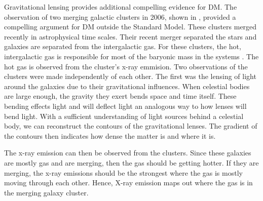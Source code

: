 \begin{figure}[ht]
\end{figure}

Gravitational lensing provides additional compelling evidence for DM.
The observation of two merging galactic clusters in 2006, shown in , provided a compelling argument for DM outside the Standard Model.
These clusters merged recently in astrophysical time scales.
Their recent merger separated the stars and galaxies are separated from the intergalactic gas.
For these clusters, the hot, intergalactic gas is responsible for most of the baryonic mass in the systems \cite{Hooper:DMHistory}.
The hot gas is observed from the cluster's x-ray emmision.
Two observations of the clusters were made independently of each other.
The first was the lensing of light around the galaxies due to their gravitational influences.
When celestial bodies are large enough, the gravity they exert bends space and time itself.
These bending effects light and will deflect light an analogous way to how lenses will bend light.
With a sufficient understanding of light sources behind a celestial body, we can reconstruct the contours of the gravitational lenses.
The gradient of the contours then indicates how dense the matter is and where it is.

The x-ray emission can then be observed from the clusters.
Since these galaxies are mostly gas and are merging, then the gas should be getting hotter.
If they are merging, the x-ray emissions should be the strongest where the gas is mostly moving through each other.
Hence, X-ray emission maps out where the gas is in the merging galaxy cluster.


